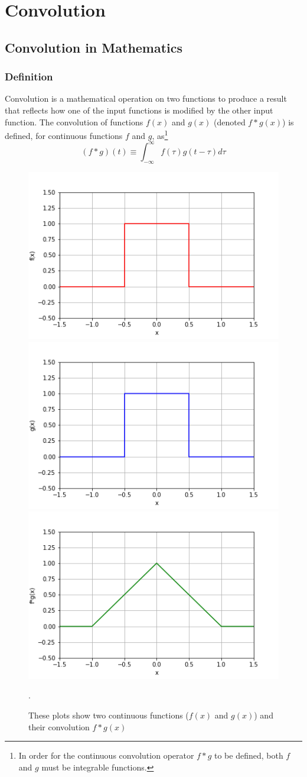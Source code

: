 \chapter[Convolution]{Convolution}
\label{ch:convolution}
\section{Convolution in Mathematics}
\label{sec:convolution:mathematics}
\subsection{Definition}
\label{sec:convolution:mathematics:definitions}
Convolution is a mathematical operation on two functions to produce a result that reflects how one of the input functions is modified by the other input function.\newline
The convolution of functions $f(x)$ and $g(x)$ (denoted $f*g(x)$) is defined\cite{Bracewell2000}, for continuous functions $f$ and $g$, as\footnote{In order for the continuous convolution operator $f * g$ to be defined, both $f$ and $g$ must be integrable functions.}
\begin{equation}
(f * g) (t)\equiv\int_{-\infty}^{\infty} f(\tau) g(t-\tau)d\tau
\end{equation}
\begin{figure}[h]
    \includegraphics[width=.32\linewidth]{graphics/convolution/convolution_continuos_f_gebs.png}
    \includegraphics[width=.32\linewidth]{graphics/convolution/convolution_continuos_g_gebs.png}
    \includegraphics[width=.32\linewidth]{graphics/convolution/convolution_continuos_fg_gebs.png}
    \caption{These plots show two continuous functions ($f(x)$ and $g(x)$) and their convolution $f*g(x)$}.
    \label{fig:continuousconvolution}
\end{figure}\FloatBarrier
